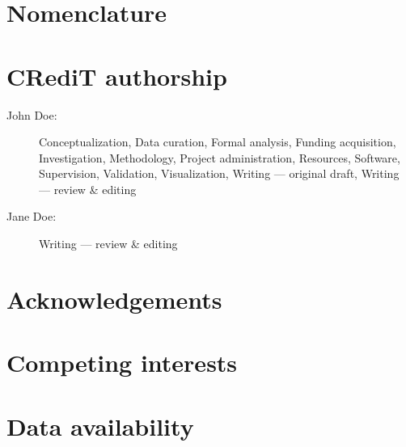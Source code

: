 

\section{Nomenclature}
\label{app:nomenclature}


\section{CRediT authorship}
\label{app:credit}

\begin{description}
    \item[John Doe:] Conceptualization, Data curation, Formal analysis, Funding acquisition, Investigation, Methodology, Project administration, Resources, Software, Supervision, Validation, Visualization, Writing --- original draft, Writing --- review \& editing
    \item[Jane Doe:] Writing --- review \& editing
\end{description}


\section{Acknowledgements}
\label{app:acknowledgements}


\section{Competing interests}
\label{app:interests}


\section{Data availability}
\label{app:data}
